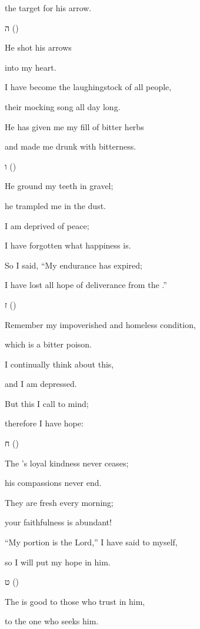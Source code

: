 {\par }{\Q the target
for his arrow.
\par }{\SH ה ({})
\par }{\Q {}He shot his arrows
\par }{\Q into my heart.
\par }{\Q {}I have become
the laughingstock
of all
people,
\par }{\Q their mocking song
all
day long.
\par }{\Q {}He has given me my fill
of bitter herbs
\par }{\Q and made
me drunk
with bitterness.
\par }{\SH ו ({})
\par }{\Q {}He ground my teeth in gravel;
\par }{\Q he trampled me in the dust.
\par }{\Q {}I am deprived
of peace;
\par }{\Q I
have forgotten
what happiness is.
\par }{\Q {}So I said,
“My endurance
has expired;
\par }{\Q I have lost all hope
of deliverance from the
{}.”
\par }{\SH ז ({})
\par }{\Q {}Remember my impoverished and homeless condition,
\par }{\Q which is a bitter poison.
\par }{\Q {}I continually
think
about this,
\par }{\Q and I am depressed.
\par }{\Q {}But this
I call
to
mind;
\par }{\Q therefore
I have hope:
\par }{\SH ח ({})
\par }{\Q {}The
{}’s loyal kindness never ceases;
\par }{\Q his compassions never end.
\par }{\Q {}They are fresh
every morning;
\par }{\Q your faithfulness
is abundant!
\par }{\Q {}“My portion
is the Lord,”
I have said
to myself,
\par }{\Q so
I will put my hope in him.
\par }{\SH ט ({})
\par }{\Q {}The
{} is good to those who trust in him,
\par }{\Q to the one who seeks him.
}
